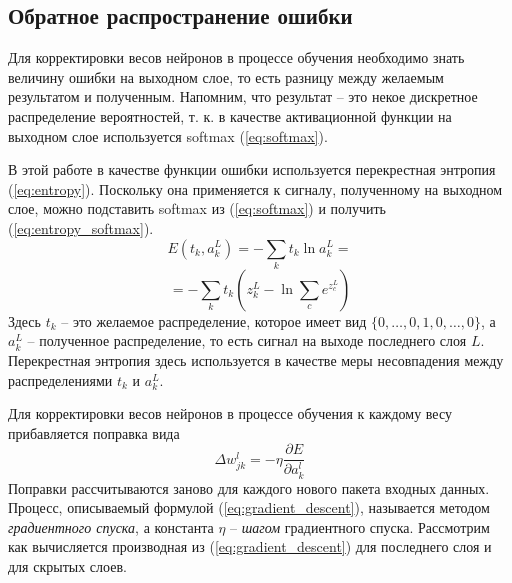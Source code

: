 \documentclass[a4paper,12pt]{article}
\theoremstyle{remark}
\begin{document}
	\subsection{Обратное распространение ошибки}
	
	Для корректировки весов нейронов в процессе обучения необходимо знать величину ошибки на выходном слое, то есть разницу между желаемым результатом и полученным. Напомним, что результат -- это некое дискретное распределение вероятностей, т. к. в качестве активационной функции на выходном слое используется softmax (\ref{eq:softmax}).
	
	В этой работе в качестве функции ошибки используется перекрестная энтропия (\ref{eq:entropy}). Поскольку она применяется к сигналу, полученному на выходном слое, можно подставить softmax из (\ref{eq:softmax}) и получить (\ref{eq:entropy_softmax}).
	\begin{equation}\label{eq:entropy}
		E(t_k, a_k^L) = - \sum_k t_k \ln a_k^L =
	\end{equation}
	\begin{equation}\label{eq:entropy_softmax}
		= - \sum_k t_k (z_k^L - \ln \sum_c e^{z_c^L})
	\end{equation}
	Здесь $t_k$ -- это желаемое распределение, которое имеет вид $\{0, \dots, 0, 1, 0, \dots, 0\}$, а $a_k^L$ -- полученное распределение, то есть сигнал на выходе последнего слоя $L$. Перекрестная энтропия здесь используется в качестве меры несовпадения между распределениями $t_k$ и $a_k^L$.
	
	Для корректировки весов нейронов в процессе обучения к каждому весу прибавляется поправка вида
	\begin{equation}\label{eq:gradient_descent}
		\Delta w_{jk}^l = - \eta \frac{\partial E}{\partial a_k^l}
	\end{equation}
	Поправки рассчитываются заново для каждого нового пакета входных данных. Процесс, описываемый формулой (\ref{eq:gradient_descent}), называется методом \textit{градиентного спуска}, а константа $\eta$ -- \textit{шагом} градиентного спуска. Рассмотрим как вычисляется производная из (\ref{eq:gradient_descent}) для последнего слоя и для скрытых слоев.
	
\end{document}
